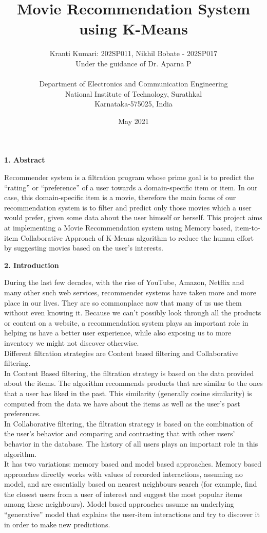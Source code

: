 \documentclass{article}
\title{\textbf{\Huge Movie Recommendation System using K-Means}}
\author{\Large Kranti Kumari: 202SP011, Nikhil Bobate - 202SP017 \\ Under the guidance of Dr. Aparna P\\\\ Department of Electronics and Communication Engineering\\ National Institute of Technology, Surathkal\\  Karnataka-575025, India}
\date{May 2021}
\begin{document}
\maketitle

\begin{flushleft}
\textbf{\large 1. Abstract}
\end{flushleft}

Recommender system is a filtration program whose prime goal is to predict the “rating” or “preference” of a user towards a domain-specific item or item. In our case, this domain-specific item is a movie, therefore the main focus of our recommendation system is to filter and predict only those movies which a user would prefer, given some data about the user himself or herself. This project aims at implementing a Movie Recommendation system using Memory based, item-to-item Collaborative Approach of K-Means algorithm to reduce the human effort by suggesting movies based on the user’s interests. \\


\begin{flushleft}
\textbf{\large 2. Introduction}
\end{flushleft}

During the last few decades, with the rise of YouTube, Amazon, Netflix and many other such web services, recommender systems have taken more and more place in our lives. They are so commonplace now that many of us use them without even knowing it. Because we can't possibly look through all the products or content on a website, a recommendation system plays an important role in helping us have a better user experience, while also exposing us to more inventory we might not discover otherwise. \\

Different filtration strategies are Content based filtering and Collaborative filtering. \\
In Content Based filtering, the filtration strategy is based on the data provided about the items. The algorithm recommends products that are similar to the ones that a user has liked in the past. This similarity (generally cosine similarity) is computed from the data we have about the items as well as the user’s past preferences.\\
In Collaborative filtering, the filtration strategy is based on the combination of the user’s behavior and comparing and contrasting that with other users’ behavior in the database. The history of all users plays an important role in this algorithm. \\ 
It has two variations: memory based and model based approaches. Memory based approaches directly works with values of recorded interactions, assuming no model, and are essentially based on nearest neighbours search (for example, find the closest users from a user of interest and suggest the most popular items among these neighbours). Model based approaches assume an underlying “generative” model that explains the user-item interactions and try to discover it in order to make new predictions. \\
\end{document}
